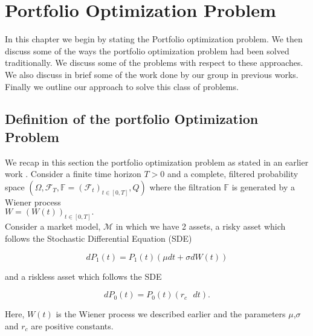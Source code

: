 \chapter{Portfolio Optimization Problem}\label{chapter:PO_Problem}
In this chapter we begin by stating the Portfolio optimization problem. We then discuss some of the ways the portfolio optimization problem had been solved traditionally. We discuss some of the problems with respect to these approaches. 
We also discuss in brief some of the work done by our group in previous works.
Finally we outline our approach to solve this class of problems.

\section{Definition of the portfolio Optimization Problem} \label{section:POProblem}
We recap in this section the portfolio optimization problem as stated in an earlier work \cite{FernandezKschonnek2022}. Consider a finite time horizon $T > 0$ and a complete, filtered probability space
$(\Omega, \mathcal{F}_T , \mathbb{F} = (\mathcal{F}_{t})_{t \in [0,T]},Q)$ where the filtration $\mathbb{F}$ is generated by a Wiener process \cite{wiener1923differential} \\$W = (W(t))_{t\in[0,T]}.$\\

Consider a market model, $\mathcal{M}$ in which we have 2 assets, a risky asset which follows the Stochastic Differential Equation (SDE)

\begin{equation}
     dP_1(t) = P_1(t)(\mu dt + \sigma dW(t))
\end{equation}

 and a riskless asset which follows the SDE
 
\begin{equation}
     dP_0(t) = P_0(t)(r_c\text{ }dt).
\end{equation}

Here, $W(t)$ is the Wiener process we described earlier and the parameters $\mu$,$\sigma$ and $r_c$ are positive constants.

